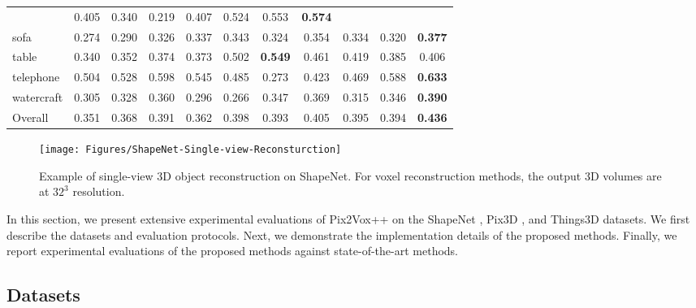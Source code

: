 \documentclass[twocolumn]{svjour3}
\begin{document}
\begin{table*}[!t]
{\begin{tabular}{lcccccccccc}
                   & 0.405      & 0.340      & 0.219
                   & 0.407      & 0.524
                   & 0.553      & \bf{0.574} \\
      sofa         & 0.274      & 0.290      & 0.326
                   & 0.337      & 0.343      & 0.324
                   & 0.354      & 0.334
                   & 0.320      & \bf{0.377} \\
      table        & 0.340      & 0.352      & 0.374
                   & 0.373      & 0.502      & \bf{0.549}
                   & 0.461      & 0.419
                   & 0.385      & 0.406 \\
      telephone    & 0.504      & 0.528      & 0.598
                   & 0.545      & 0.485      & 0.273
                   & 0.423      & 0.469
                   & 0.588      & \bf{0.633} \\
      watercraft   & 0.305      & 0.328      & 0.360
                   & 0.296      & 0.266      & 0.347
                   & 0.369      & 0.315
                   & 0.346      & \bf{0.390} \\
      \midrule
      Overall      & 0.351      & 0.368      & 0.391
                   & 0.362      & 0.398      & 0.393
                   & 0.405      & 0.395
                   & 0.394      & \bf{0.436} \\
      \bottomrule
    \end{tabular}
  }
  \label{tab:shapenet-voxel-reconstruction-fscore}
\end{table*}

\begin{figure*}
  \centering
  \resizebox{\linewidth}{!} {
    \texttt{[image: Figures/ShapeNet-Single-view-Reconsturction]}
  }
  \caption{Example of single-view 3D object reconstruction on ShapeNet. For voxel reconstruction methods, the output 3D volumes are at $32^3$ resolution.}
  \label{fig:shapenet-single-view-reconstruction}
  \vspace{1 mm}
\end{figure*}

In this section, we present extensive experimental evaluations of Pix2Vox++ on the ShapeNet \citep{DBLP:conf/cvpr/WuSKYZTX15}, Pix3D \citep{DBLP:conf/cvpr/Sun0ZZZXTF18}, and Things3D datasets.
We first describe the datasets and evaluation protocols.
Next, we demonstrate the implementation details of the proposed methods.
Finally, we report experimental evaluations of the proposed methods against state-of-the-art methods.

\subsection{Datasets}
\end{document}
